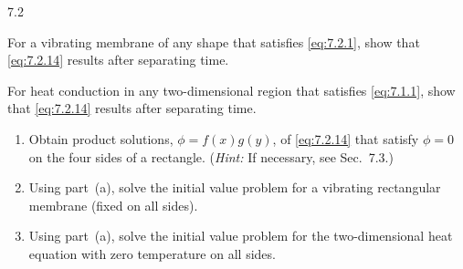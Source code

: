 \begin{exercises}{7.2}

\item For a vibrating membrane of any shape that satisfies \eqref{eq:7.2.1}, show that \eqref{eq:7.2.14} results after separating time.

\item For heat conduction in any two-dimensional region that satisfies \eqref{eq:7.1.1}, show that \eqref{eq:7.2.14} results after separating time.

\item
\begin{enumerate}
\item[(a)] Obtain product solutions, $\phi = f(x)g(y)$, of \eqref{eq:7.2.14} that satisfy $\phi = 0$ on the four sides of a rectangle.  (\emph{Hint:} If necessary, see Sec.~7.3.)

\item[(b)] Using part~(a), solve the initial value problem for a vibrating rectangular membrane (fixed on all sides).

\item[(c)] Using part~(a), solve the initial value problem for the two-dimensional heat equation with zero temperature on all sides.
\end{enumerate}

\end{exercises}
